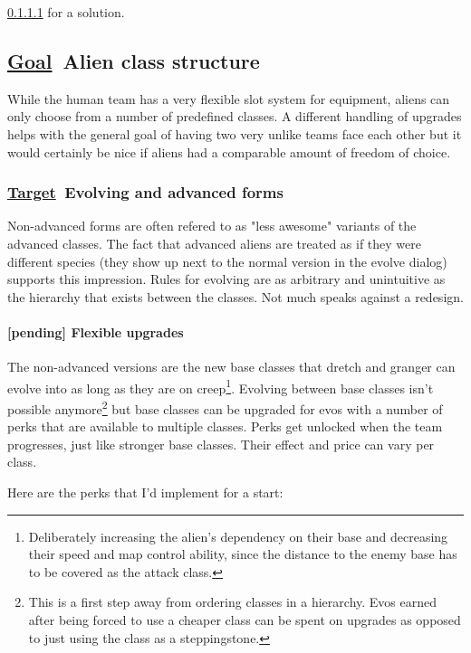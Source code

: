 \documentclass{scrartcl}
\newcommand{\goal}     [0]{\textbf{\underline{Goal}\ }}
\newcommand{\target}   [0]{\textbf{\underline{Target}\ }}
\newcommand{\pending}  [0]{\textcolor{pending}  {\textbf{[pending] }}}
\begin{document}
\ref{flexible-upgrades} for a solution.

\subsection{\goal Alien class structure}

While the human team has a very flexible slot system for equipment, aliens can only choose from a number of predefined classes. A different handling of upgrades helps with the general goal of having two very unlike teams face each other but it would certainly be nice if aliens had a comparable amount of freedom of choice.

\subsubsection{\target Evolving and advanced forms}

Non-advanced forms are often refered to as "less awesome" variants of the advanced classes. The fact that advanced aliens are treated as if they were different species (they show up next to the normal version in the evolve dialog) supports this impression. Rules for evolving are as arbitrary and unintuitive as the hierarchy that exists between the classes. Not much speaks against a redesign.

\paragraph{\pending Flexible upgrades}
\label{flexible-upgrades}

The non-advanced versions are the new base classes that dretch and granger can evolve into as long as they are on creep\footnote{Deliberately increasing the alien's dependency on their base and decreasing their speed and map control ability, since the distance to the enemy base has to be covered as the attack class.}. Evolving between base classes isn't possible anymore\footnote{This is a first step away from ordering classes in a hierarchy. Evos earned after being forced to use a cheaper class can be spent on upgrades as opposed to just using the class as a steppingstone.} but base classes can be upgraded for evos with a number of perks that are available to multiple classes. Perks get unlocked when the team progresses, just like stronger base classes. Their effect and price can vary per class.

Here are the perks that I'd implement for a start:
\end{document}
